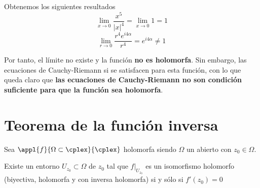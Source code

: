 \documentclass{apuntes}
\begin{document}
\begin{example}
\begin{enumerate}
Obtenemos los siguientes resultados
\[\lim_{x \to 0} \frac{x^5}{|x|^4} = \lim_{x \to 0} 1 = 1\]
\[\lim_{r \to 0} \frac{r^4 e^{i4α}}{r^4} = e^{i4α} \neq 1\]

Por tanto, el límite no existe y la función \textbf{no es holomorfa}. Sin embargo, las ecuaciones de Cauchy-Riemann si se satisfacen para esta función, con lo que queda claro que \textbf{las ecuaciones de Cauchy-Riemann no son condición suficiente para que la función sea holomorfa}.
\end{enumerate}
\end{example}

\section{Teorema de la función inversa}
\begin{theorem}
Sea $\appl{f}{\Omega\subset \cplex}{\cplex}$ holomorfa siendo $\Omega$ un abierto con $z_0\in \Omega$.

Existe un entorno $U_{z_0}\subset \Omega$ de $z_0$ tal que $f|_{U_{z_0}}$ es un isomorfismo holomorfo (biyectiva, holomorfa y con inversa holomorfa) si y sólo si $f'(z_0)=0$
\end{theorem}
\end{document}
